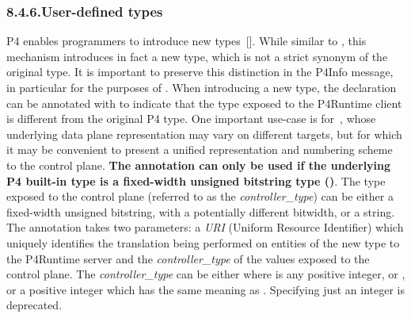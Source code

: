 \documentclass[11pt]{article}
\begin{document}
{%
\subsubsection{8.4.6.\hspace*{0.5em}User-defined types}\label{sec-user-defined-types}%

\noindent{}P4 enables programmers to introduce new types~[]. While similar
to , this mechanism introduces in fact a new type, which is not a
strict synonym of the original type. It is important to preserve this
distinction in the P4Info message, in particular for the purposes of
. When introducing a new type, the
declaration can be annotated with  to indicate that the
type exposed to the P4Runtime client is different from the original P4 type. One
important use-case is for~,
whose underlying data plane representation may vary on different targets, but
for which it may be convenient to present a unified representation and numbering
scheme to the control plane. \textbf{The  annotation can only
be used if the underlying P4 built-in type is a fixed-width unsigned bitstring
type ()}. The type exposed to the control plane (referred to as the
\emph{controller\_type}) can be either a fixed-width unsigned bitstring, with a
potentially different bitwidth, or a string. The annotation takes two
parameters: a \emph{URI} (Uniform Resource Identifier) which uniquely identifies the
translation being performed on entities of the new type to the P4Runtime server
and the \emph{controller\_type} of the values exposed to the control plane. The
\emph{controller\_type} can be either  where  is any positive integer, or
, or a positive integer  which has the same meaning as .
Specifying just an integer is deprecated.%

}
\end{document}
